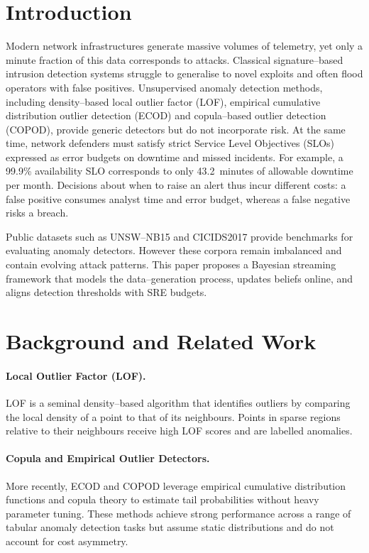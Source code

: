 \documentclass{article}
\begin{document}
\section{Introduction}
Modern network infrastructures generate massive volumes of telemetry, yet only a minute fraction of this data corresponds to attacks.  Classical signature--based intrusion detection systems struggle to generalise to novel exploits and often flood operators with false positives.  Unsupervised anomaly detection methods, including density--based local outlier factor (LOF)\cite{breunig2000lof}, empirical cumulative distribution outlier detection (ECOD)\cite{li2022ecod} and copula--based outlier detection (COPOD)\cite{li2020copod}, provide generic detectors but do not incorporate risk.  At the same time, network defenders must satisfy strict Service Level Objectives (SLOs) expressed as error budgets on downtime and missed incidents.  For example, a 99.9\% availability SLO corresponds to only 43.2~minutes of allowable downtime per month.  Decisions about when to raise an alert thus incur different costs: a false positive consumes analyst time and error budget, whereas a false negative risks a breach.

Public datasets such as UNSW--NB15 and CICIDS2017 provide benchmarks for evaluating anomaly detectors\cite{moustafa2015unsw,sharafaldin2018cicids}.  However these corpora remain imbalanced and contain evolving attack patterns.  This paper proposes a Bayesian streaming framework that models the data--generation process, updates beliefs online, and aligns detection thresholds with SRE budgets.

\section{Background and Related Work}
\paragraph{Local Outlier Factor (LOF).}  LOF\cite{breunig2000lof} is a seminal density--based algorithm that identifies outliers by comparing the local density of a point to that of its neighbours.  Points in sparse regions relative to their neighbours receive high LOF scores and are labelled anomalies.

\paragraph{Copula and Empirical Outlier Detectors.}  More recently, ECOD\cite{li2022ecod} and COPOD\cite{li2020copod} leverage empirical cumulative distribution functions and copula theory to estimate tail probabilities without heavy parameter tuning.  These methods achieve strong performance across a range of tabular anomaly detection tasks but assume static distributions and do not account for cost asymmetry.
\end{document}
